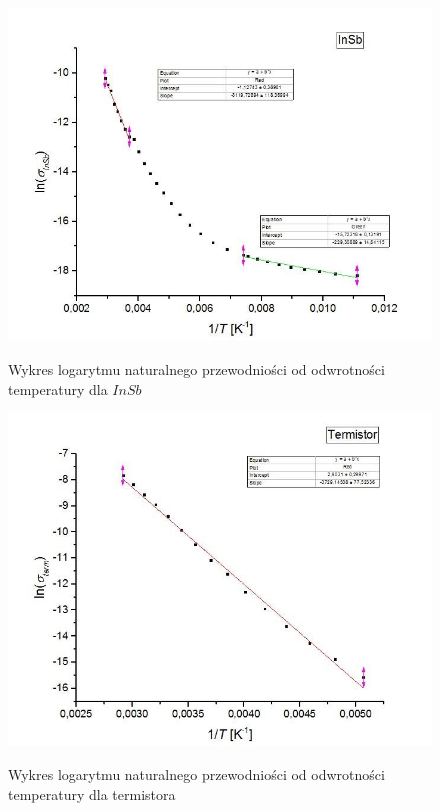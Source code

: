 \documentclass[11pt]{article}
\begin{document}
\begin{figure}[h!]
\centering
\caption{Wykres logarytmu naturalnego przewodniości od odwrotności temperatury dla $InSb$}{\label{w2}}
\includegraphics[scale=0.5]{W2.jpg}
\end{figure}
\begin{figure}[h!]
\centering
\caption{Wykres logarytmu naturalnego przewodniości od odwrotności temperatury dla termistora}{\label{w3}}
\includegraphics[scale=0.5]{W3.jpg}
\end{figure}
\end{document}
